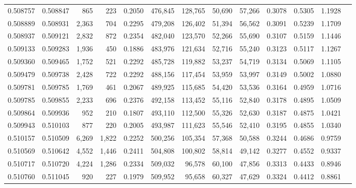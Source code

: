 \begin{tabular}{rrrrrrrrrrrrr}
0.508757 & 0.508847 &    865 &   223 &                                     0.2050 & 476,845 & 128,765 &  50,690 &  57,266 & 0.3078 & 0.5305 & 1.1928 \\
0.508889 & 0.508931 &  2,363 &   704 &                                     0.2295 & 479,208 & 126,402 &  51,394 &  56,562 & 0.3091 & 0.5239 & 1.1709 \\
0.508937 & 0.509121 &  2,832 &   872 &                                     0.2354 & 482,040 & 123,570 &  52,266 &  55,690 & 0.3107 & 0.5159 & 1.1446 \\
0.509133 & 0.509283 &  1,936 &   450 &                                     0.1886 & 483,976 & 121,634 &  52,716 &  55,240 & 0.3123 & 0.5117 & 1.1267 \\
0.509360 & 0.509465 &  1,752 &   521 &                                     0.2292 & 485,728 & 119,882 &  53,237 &  54,719 & 0.3134 & 0.5069 & 1.1105 \\
0.509479 & 0.509738 &  2,428 &   722 &                                     0.2292 & 488,156 & 117,454 &  53,959 &  53,997 & 0.3149 & 0.5002 & 1.0880 \\
0.509781 & 0.509785 &  1,769 &   461 &                                     0.2067 & 489,925 & 115,685 &  54,420 &  53,536 & 0.3164 & 0.4959 & 1.0716 \\
0.509785 & 0.509855 &  2,233 &   696 &                                     0.2376 & 492,158 & 113,452 &  55,116 &  52,840 & 0.3178 & 0.4895 & 1.0509 \\
0.509864 & 0.509936 &    952 &   210 &                                     0.1807 & 493,110 & 112,500 &  55,326 &  52,630 & 0.3187 & 0.4875 & 1.0421 \\
0.509943 & 0.510103 &    877 &   220 &                                     0.2005 & 493,987 & 111,623 &  55,546 &  52,410 & 0.3195 & 0.4855 & 1.0340 \\
0.510157 & 0.510509 &  6,269 & 1,822 &                                     0.2252 & 500,256 & 105,354 &  57,368 &  50,588 & 0.3244 & 0.4686 & 0.9759 \\
0.510569 & 0.510642 &  4,552 & 1,446 &                                     0.2411 & 504,808 & 100,802 &  58,814 &  49,142 & 0.3277 & 0.4552 & 0.9337 \\
0.510717 & 0.510720 &  4,224 & 1,286 &                                     0.2334 & 509,032 &  96,578 &  60,100 &  47,856 & 0.3313 & 0.4433 & 0.8946 \\
0.510760 & 0.511045 &    920 &   227 &                                     0.1979 & 509,952 &  95,658 &  60,327 &  47,629 & 0.3324 & 0.4412 & 0.8861 \\

\end{tabular}
